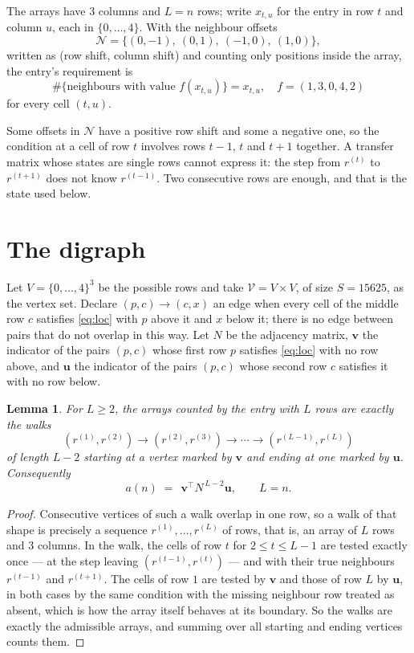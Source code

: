 \documentclass[11pt,a4paper]{article}
\theoremstyle{plain}
\newtheorem{lemma}[theorem]{Lemma}
\theoremstyle{definition}
\begin{document}
The arrays have $3$ columns and $L=n$ rows; write $x_{t,u}$ for the entry in
row $t$ and column $u$, each in $\{0,\dots,4\}$. With the neighbour offsets
\[
\mathcal N=\{(0,-1),\ (0,1),\ (-1,0),\ (1,0)\},
\]
written as (row shift, column shift) and counting only positions inside the array, the
entry's requirement is
\begin{equation}\label{eq:loc}
\#\{\text{neighbours with value }f(x_{t,u})\}=x_{t,u},\quad f=(1,3,0,4,2)
\end{equation}
for every cell $(t,u)$.

Some offsets in $\mathcal N$ have a positive row shift and some a negative one, so the
condition at a cell of row $t$ involves rows $t-1$, $t$ and $t+1$ together. A transfer
matrix whose states are single rows cannot express it: the step from $r^{(t)}$ to
$r^{(t+1)}$ does not know $r^{(t-1)}$. Two consecutive rows are enough, and that is
the state used below.

\section{The digraph}

Let $V=\{0,\dots,4\}^{3}$ be the possible rows and take
$\mathcal V=V\times V$, of size $S=15625$, as the vertex set. Declare $(p,c)\to(c,x)$ an edge
when every cell of the middle row $c$ satisfies \eqref{eq:loc} with $p$ above it and $x$
below it; there is no edge between pairs that do not overlap in this way. Let $N$ be the
adjacency matrix, $\mathbf{v}$ the indicator of the pairs $(p,c)$ whose first row $p$
satisfies \eqref{eq:loc} with no row above, and $\mathbf{u}$ the indicator of
the pairs $(p,c)$ whose second row $c$ satisfies it with no row below.

\begin{lemma}\label{lem:walk}
For $L\ge2$, the arrays counted by the entry with $L$ rows are exactly the walks
\[
(r^{(1)},r^{(2)})\to(r^{(2)},r^{(3)})\to\cdots\to(r^{(L-1)},r^{(L)})
\]
of length $L-2$ starting at a vertex marked by $\mathbf{v}$ and ending at one marked by
$\mathbf{u}$. Consequently
\[
a(n)\;=\;\,\mathbf{v}^{\!\top}N^{\,L-2}\mathbf{u},\qquad L=n .
\]
\end{lemma}

\begin{proof}
Consecutive vertices of such a walk overlap in one row, so a walk of that shape is
precisely a sequence $r^{(1)},\dots,r^{(L)}$ of rows, that is, an array of $L$ rows
and $3$ columns. In the walk, the cells of row $t$ for $2\le t\le L-1$ are tested
exactly once --- at the step leaving $(r^{(t-1)},r^{(t)})$ --- and with their true
neighbours $r^{(t-1)}$ and $r^{(t+1)}$. The cells of row $1$ are tested by
$\mathbf{v}$ and those of row $L$ by $\mathbf{u}$, in both cases by the same condition
with the missing neighbour row treated as absent, which is how the array itself behaves at
its boundary. So the walks are exactly the admissible arrays, and summing over all starting
and ending vertices counts them.
\end{proof}
\end{document}
